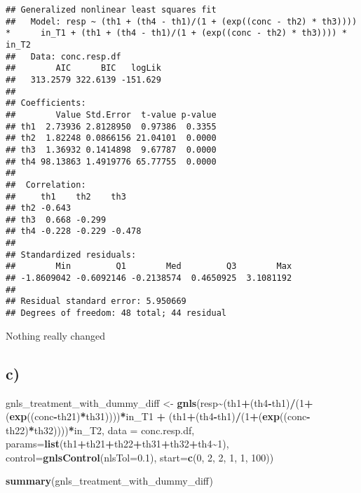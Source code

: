 \documentclass[
]{article}
\newenvironment{Shaded}{\begin{snugshade}}{\end{snugshade}}
\newcommand{\AttributeTok}[1]{\textcolor[rgb]{0.13,0.29,0.53}{#1}}
\newcommand{\DecValTok}[1]{\textcolor[rgb]{0.00,0.00,0.81}{#1}}
\newcommand{\FloatTok}[1]{\textcolor[rgb]{0.00,0.00,0.81}{#1}}
\newcommand{\FunctionTok}[1]{\textcolor[rgb]{0.13,0.29,0.53}{\textbf{#1}}}
\newcommand{\NormalTok}[1]{#1}
\newcommand{\OtherTok}[1]{\textcolor[rgb]{0.56,0.35,0.01}{#1}}
\newcommand{\SpecialCharTok}[1]{\textcolor[rgb]{0.81,0.36,0.00}{\textbf{#1}}}
\begin{document}
\begin{verbatim}
## Generalized nonlinear least squares fit
##   Model: resp ~ (th1 + (th4 - th1)/(1 + (exp((conc - th2) * th3)))) *      in_T1 + (th1 + (th4 - th1)/(1 + (exp((conc - th2) * th3)))) *      in_T2 
##   Data: conc.resp.df 
##        AIC      BIC   logLik
##   313.2579 322.6139 -151.629
## 
## Coefficients:
##        Value Std.Error  t-value p-value
## th1  2.73936 2.8128950  0.97386  0.3355
## th2  1.82248 0.0866156 21.04101  0.0000
## th3  1.36932 0.1414898  9.67787  0.0000
## th4 98.13863 1.4919776 65.77755  0.0000
## 
##  Correlation: 
##     th1    th2    th3   
## th2 -0.643              
## th3  0.668 -0.299       
## th4 -0.228 -0.229 -0.478
## 
## Standardized residuals:
##        Min         Q1        Med         Q3        Max 
## -1.8609042 -0.6092146 -0.2138574  0.4650925  3.1081192 
## 
## Residual standard error: 5.950669 
## Degrees of freedom: 48 total; 44 residual
\end{verbatim}

Nothing really changed

\hypertarget{c}{%
\subsection{c)}\label{c}}

\begin{Shaded}
\begin{Highlighting}[]
\NormalTok{gnls\_treatment\_with\_dummy\_diff }\OtherTok{\textless{}{-}} \FunctionTok{gnls}\NormalTok{(resp}\SpecialCharTok{\textasciitilde{}}\NormalTok{(th1}\SpecialCharTok{+}\NormalTok{(th4}\SpecialCharTok{{-}}\NormalTok{th1)}\SpecialCharTok{/}\NormalTok{(}\DecValTok{1}\SpecialCharTok{+}\NormalTok{(}\FunctionTok{exp}\NormalTok{((conc}\SpecialCharTok{{-}}\NormalTok{th21)}\SpecialCharTok{*}\NormalTok{th31))))}\SpecialCharTok{*}\NormalTok{in\_T1 }\SpecialCharTok{+}
\NormalTok{                                    (th1}\SpecialCharTok{+}\NormalTok{(th4}\SpecialCharTok{{-}}\NormalTok{th1)}\SpecialCharTok{/}\NormalTok{(}\DecValTok{1}\SpecialCharTok{+}\NormalTok{(}\FunctionTok{exp}\NormalTok{((conc}\SpecialCharTok{{-}}\NormalTok{th22)}\SpecialCharTok{*}\NormalTok{th32))))}\SpecialCharTok{*}\NormalTok{in\_T2,}
                                 \AttributeTok{data =}\NormalTok{ conc.resp.df,}
                                 \AttributeTok{params=}\FunctionTok{list}\NormalTok{(th1}\SpecialCharTok{+}\NormalTok{th21}\SpecialCharTok{+}\NormalTok{th22}\SpecialCharTok{+}\NormalTok{th31}\SpecialCharTok{+}\NormalTok{th32}\SpecialCharTok{+}\NormalTok{th4}\SpecialCharTok{\textasciitilde{}}\DecValTok{1}\NormalTok{),}
                                 \AttributeTok{control=}\FunctionTok{gnlsControl}\NormalTok{(}\AttributeTok{nlsTol=}\FloatTok{0.1}\NormalTok{),}
                                 \AttributeTok{start=}\FunctionTok{c}\NormalTok{(}\DecValTok{0}\NormalTok{, }\DecValTok{2}\NormalTok{, }\DecValTok{2}\NormalTok{, }\DecValTok{1}\NormalTok{, }\DecValTok{1}\NormalTok{, }\DecValTok{100}\NormalTok{))}

\FunctionTok{summary}\NormalTok{(gnls\_treatment\_with\_dummy\_diff)}
\end{Highlighting}
\end{Shaded}
\end{document}
